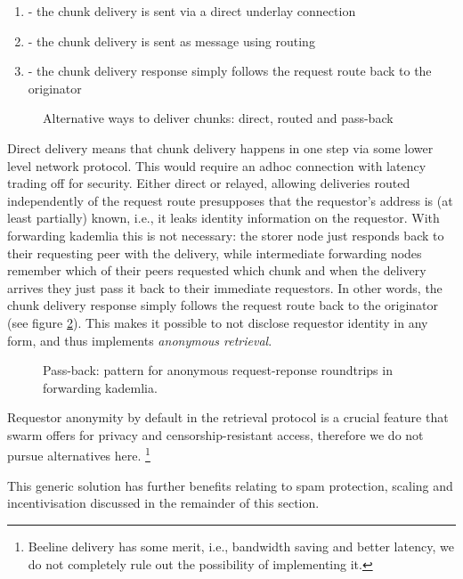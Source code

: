 \begin{enumerate}
    \item {} - the chunk delivery is sent via a direct underlay connection 
    \item {} - the chunk delivery is sent as message using routing
    \item {} - the chunk delivery response simply follows the request route back to the originator
\end{enumerate}


\begin{figure}[htbp]
   \centering
   \caption{Alternative ways to deliver chunks: direct, routed  and pass-back}
   \label{fig:chunk-delivery}
\end{figure}

Direct delivery means that chunk delivery happens in one step via some lower level network protocol. This would require an adhoc connection with latency trading off for security. Either direct or relayed, allowing deliveries routed independently of the request route presupposes that the requestor's address is (at least partially) known, i.e., it leaks identity information on the requestor. With forwarding kademlia this is not necessary: the storer node just responds back to their requesting peer with the delivery, while intermediate forwarding nodes remember which of their peers requested which chunk and when the delivery arrives they just pass it back to their immediate requestors. In other words, the chunk delivery response simply follows the request route back to the originator (see figure \ref{fig:request-response}). This makes it possible to not disclose requestor identity in any form, and thus implements \emph{anonymous retrieval}. 

\begin{figure}[htbp]
   \centering
   \caption{Pass-back: pattern for anonymous request-reponse roundtrips in forwarding kademlia.}
   \label{fig:request-response}
\end{figure}

Requestor anonymity by default in the retrieval protocol is a crucial feature that swarm offers for privacy and censorship-resistant access, therefore we do not pursue alternatives here.%
%
\footnote{Beeline delivery has some merit, i.e., bandwidth saving and better latency, we do not completely rule out the possibility of implementing it. 
}


This generic solution has further benefits relating to spam protection, scaling and incentivisation discussed in the remainder of this  section.


